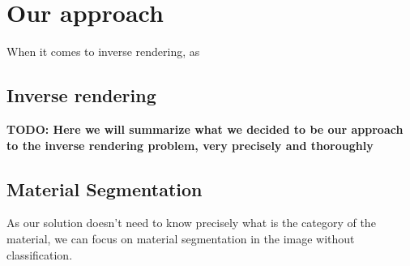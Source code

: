 \chapter{Our approach}
\label{kap:approach}
When it comes to inverse rendering, as  


\section{Inverse rendering}
\textbf{TODO: Here we will summarize what we decided to be our approach to the inverse rendering problem, very precisely and thoroughly }

\section{Material Segmentation}
As our solution doesn't need to know precisely what is the category of the material, we can focus on material segmentation in the image without classification.